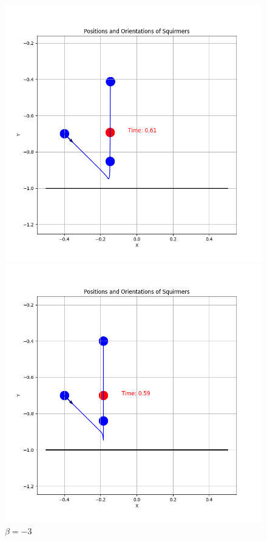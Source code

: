 \documentclass{article}
\begin{document}
\begin{figure}[H]
    \centering
    \begin{minipage}{0.49\textwidth}
        \includegraphics[width=1.1\textwidth]{graphs/simulations/border/betam1_5/mpi_4.png}
        \caption{\footnotesize $\beta = -1.5$}
    \end{minipage}\hfill
    \begin{minipage}{0.49\textwidth}
        \includegraphics[width=1.1\textwidth]{graphs/simulations/border/betam3/mpi_4.png}
        \caption{\footnotesize $\beta = -3$}
    \end{minipage}
\end{figure}
\end{document}
